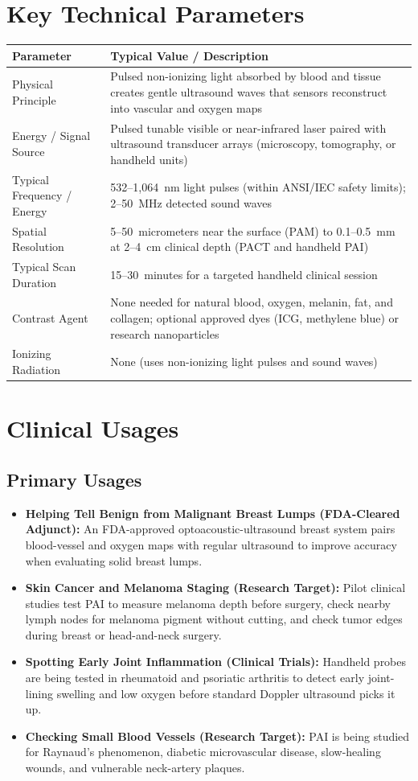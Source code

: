\section{Key Technical Parameters}
\noindent
\begin{tabularx}{\textwidth}{@{}l X@{}}
\toprule
\textbf{Parameter} & \textbf{Typical Value / Description} \\
\midrule
Physical Principle & Pulsed non-ionizing light absorbed by blood and tissue creates gentle ultrasound waves that sensors reconstruct into vascular and oxygen maps \\
Energy / Signal Source & Pulsed tunable visible or near-infrared laser paired with ultrasound transducer arrays (microscopy, tomography, or handheld units) \\
Typical Frequency / Energy & 532--1,064~nm light pulses (within ANSI/IEC safety limits); 2--50~MHz detected sound waves \\
Spatial Resolution & 5--50~micrometers near the surface (PAM) to 0.1--0.5~mm at 2--4~cm clinical depth (PACT and handheld PAI) \\
Typical Scan Duration & 15--30~minutes for a targeted handheld clinical session \\
Contrast Agent & None needed for natural blood, oxygen, melanin, fat, and collagen; optional approved dyes (ICG, methylene blue) or research nanoparticles \\
Ionizing Radiation & None (uses non-ionizing light pulses and sound waves) \\
\bottomrule
\end{tabularx}

\section{Clinical Usages}

\subsection{Primary Usages}
\begin{itemize}
  \item \textbf{Helping Tell Benign from Malignant Breast Lumps (FDA-Cleared Adjunct):} An FDA-approved optoacoustic-ultrasound breast system pairs blood-vessel and oxygen maps with regular ultrasound to improve accuracy when evaluating solid breast lumps.
  \item \textbf{Skin Cancer and Melanoma Staging (Research Target):} Pilot clinical studies test PAI to measure melanoma depth before surgery, check nearby lymph nodes for melanoma pigment without cutting, and check tumor edges during breast or head-and-neck surgery.
  \item \textbf{Spotting Early Joint Inflammation (Clinical Trials):} Handheld probes are being tested in rheumatoid and psoriatic arthritis to detect early joint-lining swelling and low oxygen before standard Doppler ultrasound picks it up.
  \item \textbf{Checking Small Blood Vessels (Research Target):} PAI is being studied for Raynaud's phenomenon, diabetic microvascular disease, slow-healing wounds, and vulnerable neck-artery plaques.
\end{itemize}

